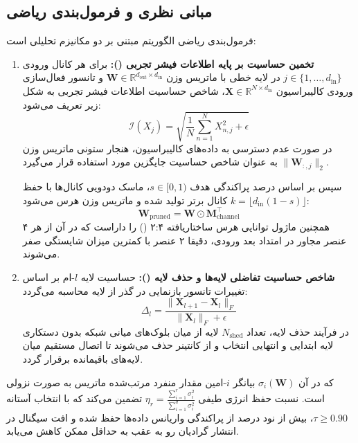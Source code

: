 \subsection{مبانی نظری و فرمول‌بندی ریاضی}
فرمول‌بندی ریاضی الگوریتم  مبتنی بر دو مکانیزم تحلیلی است:

\begin{enumerate}
    \item \textbf{تخمین حساسیت بر پایه اطلاعات فیشر تجربی ():} برای هر کانال ورودی $j \in \{1, \dots, d_{\text{in}}\}$ در لایه خطی با ماتریس وزن $\mathbf{W} \in \mathbb{R}^{d_{\text{out}} \times d_{\text{in}}}$ و تانسور فعال‌سازی ورودی کالیبراسیون $\mathbf{X} \in \mathbb{R}^{N \times d_{\text{in}}}$، شاخص حساسیت اطلاعات فیشر تجربی به شکل زیر تعریف می‌شود:
    \begin{equation}
    \mathcal{I}(X_j) = \sqrt{\frac{1}{N} \sum_{n=1}^N X_{n, j}^2 + \epsilon}
    \end{equation}
    در صورت عدم دسترسی به داده‌های کالیبراسیون، هنجار ستونی ماتریس وزن $\|\mathbf{W}_{:, j}\|_2$ به عنوان شاخص حساسیت جایگزین مورد استفاده قرار می‌گیرد.
    
    سپس بر اساس درصد پراکندگی هدف $s \in [0, 1)$، ماسک دودویی کانال‌ها با حفظ $k = \lfloor d_{\text{in}}(1 - s) \rfloor$ کانال برتر تولید شده و ماتریس وزن هرس می‌شود:
    \begin{equation}
    \mathbf{W}_{\text{pruned}} = \mathbf{W} \odot \mathbf{M}_{\text{channel}}^\top
    \end{equation}
    همچنین ماژول توانایی هرس ساختاریافته ۲:۴ () را داراست که در آن از هر ۴ عنصر مجاور در امتداد بعد ورودی، دقیقا ۲ عنصر با کمترین میزان شایستگی صفر می‌شوند.

    \item \textbf{شاخص حساسیت تفاضلی لایه‌ها و حذف لایه ():} حساسیت لایه $l$-ام بر اساس تغییرات تانسور بازنمایی در گذر از لایه محاسبه می‌گردد:
    \begin{equation}
    \Delta_l = \frac{\|\mathbf{X}_{l+1} - \mathbf{X}_l\|_F}{\|\mathbf{X}_l\|_F + \epsilon}
    \end{equation}
    در فرآیند حذف لایه، تعداد $N_{\text{shed}}$ لایه از میان بلوک‌های میانی شبکه بدون دستکاری لایه ابتدایی و انتهایی انتخاب و از کانتینر  حذف می‌شوند تا اتصال مستقیم میان لایه‌های باقیمانده برقرار گردد.
\end{enumerate}

که در آن $\sigma_i(\mathbf{W})$ بیانگر $i$-امین مقدار منفرد مرتب‌شده ماتریس به صورت نزولی است. نسبت حفظ انرژی طیفی $\eta_r = \frac{\sum_{i=1}^r \sigma_i^2}{\sum_{i=1}^{d} \sigma_i^2}$ تضمین می‌کند که با انتخاب آستانه $\tau \ge 0.90$، بیش از نود درصد از پراکندگی واریانس داده‌ها حفظ شده و افت سیگنال در انتشار گرادیان رو به عقب به حداقل ممکن کاهش می‌یابد.


